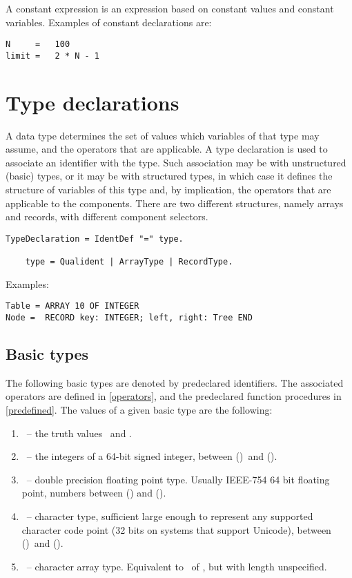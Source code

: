 \documentclass[12pt]{article}
\begin{document}
A constant expression is an expression based on constant values and constant variables. Examples of constant declarations are:

\begin{lstlisting}[style=example]
N     =   100
limit =   2 * N - 1
\end{lstlisting}

\section{Type declarations}
\label{types}

A data type determines the set of values which variables of that type may assume, and the operators that are applicable. A type declaration is used to associate an identifier with the type. Such association may be with unstructured (basic) types, or it may be with structured types, in which case it defines the structure of variables of this type and, by implication, the operators that are applicable to the components. There are two different structures, namely arrays and records, with different component selectors.

\begin{lstlisting}[style=ebnf]
    TypeDeclaration = IdentDef "=" type.

    type = Qualident | ArrayType | RecordType.
\end{lstlisting}

Examples:

\begin{lstlisting}[style=example]
Table = ARRAY 10 OF INTEGER
Node =  RECORD key: INTEGER; left, right: Tree END
\end{lstlisting}

\subsection{Basic types}
\label{types-basic}
The following basic types are denoted by predeclared identifiers. The associated operators are defined in \ref{operators}, and the predeclared function procedures in \ref{predefined}. The values of a given basic type are the following:

\begin{enumerate}
    \item \BOOLEAN\ -- the truth values \TRUE\ and \FALSE.
    \item \INTEGER\ -- the integers of a 64-bit signed integer, between \MIN(\INTEGER)\ and \MAX(\INTEGER).
    \item \REAL\ -- double precision floating point type. Usually IEEE-754 64 bit floating point, numbers between \MIN(\REAL) and \MAX(\REAL).
    \item \CHAR\ -- character type, sufficient large enough to represent any supported character code point (32 bits on systems that support Unicode), between \MIN(\CHAR)\ and \MAX(\CHAR).
    \item \STRING\ -- character array type. Equivalent to \ARRAY\ of \CHAR, but with length unspecified.
\end{enumerate}
\end{document}
